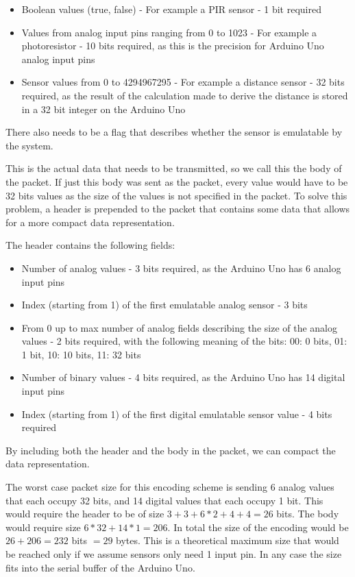 \begin{itemize}
\item Boolean values (true, false) - For example a PIR sensor - 1 bit required
\item Values from analog input pins ranging from 0 to 1023 - For example a photoresistor - 10 bits required, as this is the precision for Arduino Uno analog input pins
\item Sensor values from 0 to 4294967295 - For example a distance sensor - 32 bits required, as the result of the calculation made to derive the distance is stored in a 32 bit integer on the Arduino Uno
\end{itemize}

There also needs to be a flag that describes whether the sensor is emulatable by the system.

This is the actual data that needs to be transmitted, so we call this the body of the packet. If just this body was sent as the packet, every value would have to be 32 bits values as the size of the values is not specified in the packet. To solve this problem, a header is prepended to the packet that contains some data that allows for a more compact data representation.

The header contains the following fields:

\begin{itemize}
\item Number of analog values - 3 bits required, as the Arduino Uno has 6 analog input pins
\item Index (starting from 1) of the first emulatable analog sensor - 3 bits
\item From 0 up to max number of analog fields describing the size of the analog values - 2 bits required, with the following meaning of the bits: 00: 0 bits, 01: 1 bit, 10: 10 bits, 11: 32 bits
\item Number of binary values - 4 bits required, as the Arduino Uno has 14 digital input pins
\item Index (starting from 1) of the first digital emulatable sensor value - 4 bits required
\end{itemize}

By including both the header and the body in the packet, we can compact the data representation.

The worst case packet size for this encoding scheme is sending 6 analog values that each occupy 32 bits, and 14 digital values that each occupy 1 bit. This would require the header to be of size $3 + 3 + 6 * 2 + 4 + 4 = 26$ bits. The body would require size $6 * 32 + 14 * 1 = 206$. In total the size of the encoding would be $26 + 206 = 232$ bits $= 29$ bytes. This is a theoretical maximum size that would be reached only if we assume sensors only need 1 input pin. In any case the size fits into the serial buffer of the Arduino Uno.

